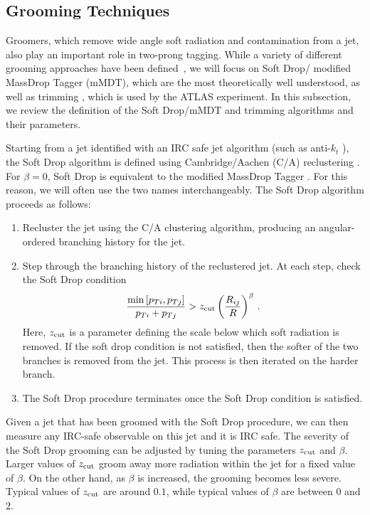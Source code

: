 \documentclass[11pt,letterpaper]{article}
\newcommand{\zcut}{z_{\rm cut}}
\begin{document}
\subsection{Grooming Techniques}\label{sec:groom_tech}

Groomers, which remove wide angle soft radiation and contamination from a jet, also play an important role in two-prong tagging.
%
While a variety of different grooming approaches have been defined~\cite{Butterworth:2008iy,Ellis:2009su,Ellis:2009me,Krohn:2009th,Dasgupta:2013via,Dasgupta:2013ihk}, we will focus on Soft Drop/ modified MassDrop Tagger (mMDT), which are the most theoretically well understood, as well as trimming \cite{Krohn:2009th}, which is used by the ATLAS experiment.
%
In this subsection, we review the definition of the Soft Drop/mMDT and trimming algorithms and their parameters.

Starting from a jet identified with an IRC safe jet algorithm (such as
anti-$k_t$ \cite{Cacciari:2008gp}), the Soft Drop algorithm is defined
using Cambridge/Aachen (C/A) reclustering
\cite{Dokshitzer:1997in,Wobisch:1998wt,Wobisch:2000dk}.
%
For $\beta = 0$, Soft Drop is equivalent to the modified MassDrop Tagger \cite{Dasgupta:2013ihk}. For this reason, we will often use the two names interchangeably.
%
The Soft Drop algorithm proceeds as follows:
%
\begin{enumerate}
%
\item Recluster the jet using the C/A clustering algorithm, producing an angular-ordered branching history for the jet.
%
\item Step through the branching history of the reclustered jet.  At each step, check the Soft Drop condition
\begin{align}\label{eq:sd_cut}
\frac{\min\left[ p_{Ti}, p_{Tj}  \right]}{p_{Ti}+p_{Tj}}> \zcut \left(   \frac{R_{ij}}{R}\right)^\beta \,.
\end{align}
Here, $\zcut$ is a parameter defining the scale below which soft radiation is removed.  If the soft drop condition is not satisfied, then the softer of the two branches is removed from the jet.  This process is then iterated on the harder branch.
%
\item The Soft Drop procedure terminates once the Soft Drop condition is satisfied.
%
\end{enumerate}
%
Given a jet that has been groomed with the Soft Drop procedure, we can
then measure any IRC-safe observable on this jet and it is
IRC safe.
%
The severity of the Soft Drop grooming can be adjusted by
tuning the parameters $\zcut$ and $\beta$.
%
Larger values of $\zcut$ groom away more radiation within the jet for a fixed value of $\beta$.
%
On the other hand, as $\beta$ is increased, the grooming becomes less
severe.
%
Typical values of $\zcut$ are around $0.1$, while typical
values of $\beta$ are between $0$ and $2$.
\end{document}
